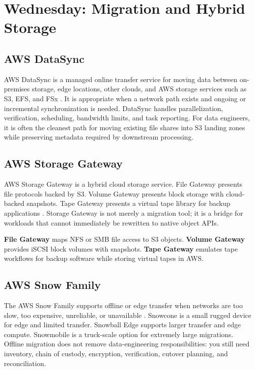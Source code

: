 \section{Wednesday: Migration and Hybrid Storage}
\subsection{AWS DataSync}
AWS DataSync is a managed online transfer service for moving data between on-premises storage, edge locations, other clouds, and AWS storage services such as S3, EFS, and FSx \cite{awsDataSyncGuide}. It is appropriate when a network path exists and ongoing or incremental synchronization is needed. DataSync handles parallelization, verification, scheduling, bandwidth limits, and task reporting. For data engineers, it is often the cleanest path for moving existing file shares into S3 landing zones while preserving metadata required by downstream processing.

\subsection{AWS Storage Gateway}
AWS Storage Gateway is a hybrid cloud storage service. File Gateway presents file protocols backed by S3. Volume Gateway presents block storage with cloud-backed snapshots. Tape Gateway presents a virtual tape library for backup applications \cite{awsStorageGatewayGuide}. Storage Gateway is not merely a migration tool; it is a bridge for workloads that cannot immediately be rewritten to native object APIs.

\begin{definitionbox}
\textbf{File Gateway} maps NFS or SMB file access to S3 objects. \textbf{Volume Gateway} provides iSCSI block volumes with snapshots. \textbf{Tape Gateway} emulates tape workflows for backup software while storing virtual tapes in AWS.
\end{definitionbox}

\subsection{AWS Snow Family}
The AWS Snow Family supports offline or edge transfer when networks are too slow, too expensive, unreliable, or unavailable \cite{awsSnowFamilyGuide}. Snowcone is a small rugged device for edge and limited transfer. Snowball Edge supports larger transfer and edge compute. Snowmobile is a truck-scale option for extremely large migrations. Offline migration does not remove data-engineering responsibilities: you still need inventory, chain of custody, encryption, verification, cutover planning, and reconciliation.

